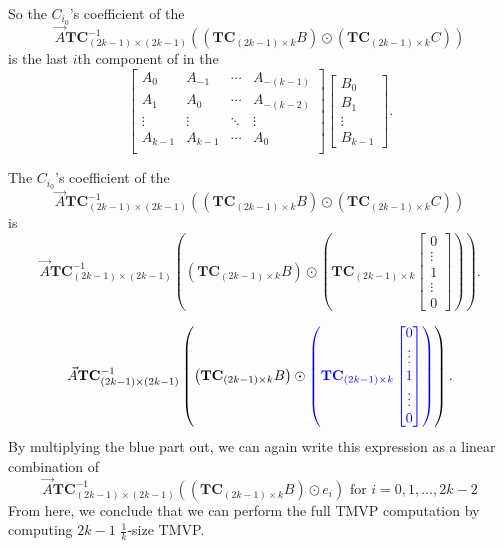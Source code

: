 \documentclass[
11pt,notheorems,hyperref={pdfauthor=whatever}
]{beamer}
\begin{document}
\begin{frame}
    So the $C_{i_0}$'s coefficient of the
    \[
        \vec{A}\mathbf{TC}_{(2k-1)\times (2k-1)}^{-1}\left(
            \left(\mathbf{TC}_{(2k-1)\times k}B\right)\odot
            \left(\mathbf{TC}_{(2k-1)\times k}C\right)
        \right)
    \]
    is the last $i$th component of in the
    \[
        \begin{bmatrix}
        A_{0} & A_{-1} & \cdots &A_{-(k-1)}\\
        A_{1} & A_{0} & \cdots &A_{-(k-2)}\\
        \vdots & \vdots & \ddots & \vdots\\
        A_{k-1} & A_{k-1} & \cdots &A_{0}\\
        \end{bmatrix}
        \begin{bmatrix}
        B_{0} \\ B_{1} \\ \vdots \\ B_{k-1}
        \end{bmatrix}.
    \]

\end{frame}

\begin{frame}
    The $C_{i_0}$'s coefficient of the
    \[
        \vec{A}\mathbf{TC}_{(2k-1)\times (2k-1)}^{-1}\left(
            \left(\mathbf{TC}_{(2k-1)\times k}B\right)\odot
            \left(\mathbf{TC}_{(2k-1)\times k}C\right)
        \right)
    \]    
    is
    \[
        \vec{A}\mathbf{TC}_{(2k-1)\times (2k-1)}^{-1}\left(
            \left(\mathbf{TC}_{(2k-1)\times k}B\right)\odot
            {\left(\mathbf{TC}_{(2k-1)\times k}\begin{bmatrix}
                0\\\vdots \\ 1 \\ \vdots \\0
            \end{bmatrix}\right)}
        \right).
    \]
\end{frame}


\begin{frame}
    \[
        \vec{A}\mathbf{TC}_{(2k-1)\times (2k-1)}^{-1}\left(
            \left(\mathbf{TC}_{(2k-1)\times k}B\right)\odot
            \textcolor{blue}{\left(\mathbf{TC}_{(2k-1)\times k}\begin{bmatrix}
                0\\\vdots \\ 1 \\ \vdots \\0
            \end{bmatrix}\right)}
        \right).
    \]
    By multiplying the blue part out, we can again write this expression as a linear combination of
    \[
        \vec{A}\mathbf{TC}_{(2k-1)\times (2k-1)}^{-1}\left(
            \left(\mathbf{TC}_{(2k-1)\times k}B\right)\odot
            e_{i}
        \right)\text{ for }i=0,1,\ldots,2k-2
    \]
    From here, we conclude that we can perform the full TMVP computation by computing $2k-1$ $\frac{1}{k}$-size TMVP.

\end{frame}
\end{document}
